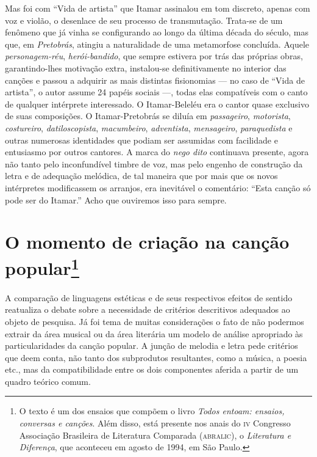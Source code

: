 Mas foi com ``Vida de artista'' que Itamar assinalou em tom discreto, apenas
com voz e violão, o desenlace de seu processo de transmutação. Trata-se
de um fenômeno que já vinha se configurando ao longo da última década do
século, mas que, em \textit{Pretobrás}, atingiu a naturalidade de uma metamorfose
concluída. Aquele \textit{personagem-réu}, \textit{herói-bandido}, que sempre estivera por
trás das próprias obras, garantindo-lhes motivação extra, instalou-se
definitivamente no interior das canções e passou a adquirir as mais
distintas fisionomias --- no caso de ``Vida de artista'', o autor assume 24
papéis sociais ---, todas elas compatíveis com o canto de qualquer
intérprete interessado. O Itamar-Beleléu era o cantor quase exclusivo
de suas composições. O Itamar-Pretobrás se diluía em \textit{passageiro},
\textit{motorista}, \textit{costureiro}, \textit{datiloscopista}, \textit{macumbeiro},
\textit{adventista}, \textit{mensageiro}, \textit{paraquedista} e outras numerosas
identidades que podiam ser assumidas com facilidade e entusiasmo por
outros cantores. A marca do \textit{nego dito} continuava presente, agora não
tanto pelo inconfundível timbre de voz, mas pelo engenho de construção
da letra e de adequação melódica, de tal maneira que por mais que os
novos intérpretes modificassem os arranjos, era inevitável o comentário:
``Esta canção só pode ser do Itamar.'' Acho que ouviremos isso para
sempre.


\chapter{O momento de criação na canção popular\footnote{O texto é um dos ensaios que compõem o livro \textit{Todos entoam: ensaios, conversas e canções}. Além disso, está presente nos anais do \textsc{iv} Congresso Associação Brasileira de Literatura Comparada (\textsc{abralic}), o \textit{Literatura e Diferença}, que aconteceu em agosto de 1994, em São Paulo.}}


A comparação de linguagens estéticas e de seus respectivos efeitos de
sentido reatualiza o debate sobre a necessidade de critérios descritivos
adequados ao objeto de pesquisa. Já foi tema de muitas considerações o
fato de não podermos extrair da área musical ou da área literária um
modelo de análise apropriado às particularidades da canção popular. A
junção de melodia e letra pede critérios que deem conta, não tanto dos
subprodutos resultantes, como a música, a poesia etc., mas da
compatibilidade entre os dois componentes aferida a partir de um quadro
teórico comum.

